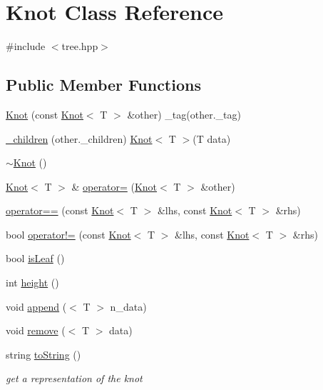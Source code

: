 \hypertarget{class_knot}{\section{\-Knot \-Class \-Reference}
\label{class_knot}
}


{\ttfamily \#include $<$tree.\-hpp$>$}

\subsection*{\-Public \-Member \-Functions}
\begin{DoxyCompactItemize}
\item 
\hyperlink{class_knot_a92883dc27430396af88d6e8a0b216d7d}{\-Knot} (const \hyperlink{class_knot}{\-Knot}$<$ \-T $>$ \&other) \-\_\-tag(other.\-\_\-tag)
\item 
\hyperlink{class_knot_a4fbe6a4a6f834298c0972a11c49a100c}{\-\_\-children} (other.\-\_\-children) \hyperlink{class_knot}{\-Knot}$<$ \-T $>$(\-T data)
\item 
\hyperlink{class_knot_abe4462897569b79486b2b6cac03c3702}{$\sim$\-Knot} ()
\item 
\hyperlink{class_knot}{\-Knot}$<$ \-T $>$ \& \hyperlink{class_knot_a2229333e1b081402213d600dd7c3b43d}{operator=} (\hyperlink{class_knot}{\-Knot}$<$ \-T $>$ \&other)
\item 
\hyperlink{class_knot_a37de81d6b6172c19435fcf0f11658bc3}{operator==} (const \hyperlink{class_knot}{\-Knot}$<$ \-T $>$ \&lhs, const \hyperlink{class_knot}{\-Knot}$<$ \-T $>$ \&rhs)
\item 
bool \hyperlink{class_knot_a9d051c01a870a9071e4adede8d79af65}{operator!=} (const \hyperlink{class_knot}{\-Knot}$<$ \-T $>$ \&lhs, const \hyperlink{class_knot}{\-Knot}$<$ \-T $>$ \&rhs)
\item 
bool \hyperlink{class_knot_a68386ab11edd866495dfbcf61cab0e01}{is\-Leaf} ()
\item 
int \hyperlink{class_knot_a9988255f899344c9f16797c4b918ac7b}{height} ()
\item 
void \hyperlink{class_knot_aa941112b1a0d38362bc4a1f632ecd35f}{append} ($<$ \-T $>$ n\-\_\-data)
\item 
void \hyperlink{class_knot_a96d632680a9180028a743cb9c36999fd}{remove} ($<$ \-T $>$ data)
\item 
string \hyperlink{class_knot_af8b780d91b4f2a43556c7b53c8f6243c}{to\-String} ()
\begin{DoxyCompactList}\small\item\em get a representation of the knot \end{DoxyCompactList}\end{DoxyCompactItemize}


